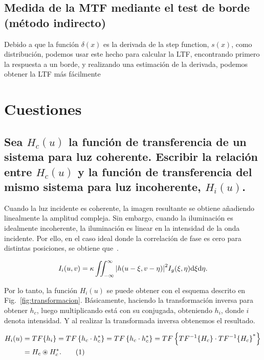 \documentclass{./packages/optica-article}
\newcommand\conv{\circledast}
\begin{document}
\subsection{Medida de la MTF mediante el test de borde (método indirecto)}\label{sec:resultados:indirecto}

Debido a que la función $\delta(x)$ es la derivada de la step function, $s(x)$, como distribución, podemos usar este hecho para calcular la LTF, encontrando primero la respuesta a un borde, y realizando una estimación de la derivada, podemos obtener la LTF más fácilmente

\section{Cuestiones}

\subsection{Sea $H_{c}(u)$ la función de transferencia de un sistema para luz coherente. Escribir la relación entre $H_{c}(u)$ y la función de transferencia del mismo sistema para luz incoherente, $H_{i}(u)$.}

Cuando la luz incidente es coherente, la imagen resultante se obtiene añadiendo linealmente la amplitud compleja. Sin embargo, cuando la iluminación es idealmente incoherente, la iluminación es linear en la intensidad de la onda incidente. Por ello, en el caso ideal donde la correlación de fase es cero para distintas posiciones, se obtiene que~\cite[p.~132--134]{goodman1996introduction}.

\begin{equation}
	I_{i}(u,v) = \kappa \iint_{-\infty}^{\infty}\abs{h(u - \xi, v- \eta)}^{2} I_{g}(\xi, \eta) \dd \xi \dd \eta.
\end{equation}

Por lo tanto, la función $H_{i}(u)$ se puede obtener con el esquema descrito en Fig.~\ref{fig:transformacion}. Básicamente, haciendo la transformación inversa para obtener $h_{c}$, luego multiplicando está con su conjugada, obteniendo $h_{i}$, donde $i$ denota intensidad. Y al realizar la transformada inversa obtenemos el resultado.

\begin{align*}
	H_{i}(u)
	 & = TF\{h_i\}
	= TF\left\{ h_{c} \cdot h^{*}_{c}\right\}
	= TF\left\{ h_{c} \cdot h^{*}_{c}\right\}
	= TF\left\{ TF^{-1}\{H_{c}\} \cdot {TF^{-1}\{H_{c}\}}^{*}\right\}
	\\
	 & = H_{c} \conv H^{*}_{c}. %
	\addtocounter{equation}{1}\tag{\theequation} \label{eq:incoherent-conv}
\end{align*}
\end{document}
